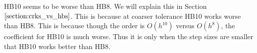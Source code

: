 HB10 seems to be worse than HB8. We will explain this in Section $\ref{section:crks_vs_hbs}$. This is because at coarser tolerance HB10 works worse than HB8. This is because though the order is $O(h^{10})$ versus $O(h^8)$, the coefficient for HB10 is much worse. Thus it is only when the step sizes are smaller that HB10 works better than HB8.


